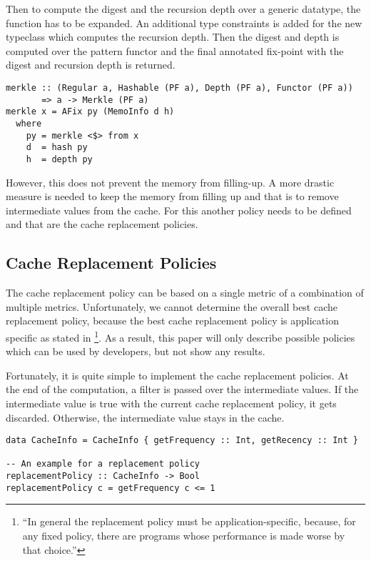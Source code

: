 Then to compute the digest and the recursion depth over a generic datatype, the  function has to be expanded. An additional type constraints  is added for the new typeclass which computes the recursion depth. Then the digest and depth is computed over the pattern functor and the final annotated fix-point with the digest and recursion depth is returned.

\begin{verbatim}
merkle :: (Regular a, Hashable (PF a), Depth (PF a), Functor (PF a)) 
       => a -> Merkle (PF a)
merkle x = AFix py (MemoInfo d h)
  where
    py = merkle <$> from x
    d  = hash py
    h  = depth py
\end{verbatim}

However, this does not prevent the memory from filling-up. A more drastic measure is needed to keep the memory from filling up and that is to remove intermediate values from the cache. For this another policy needs to be defined and that are the cache replacement policies.

\subsection{Cache Replacement Policies}

The cache replacement policy can be based on a single metric of a combination of multiple metrics. Unfortunately, we cannot determine the overall best cache replacement policy, because the best cache replacement policy is application specific as stated in \footnote{``In general the replacement policy must be application-specific, because, for any fixed policy, there are programs whose performance is made worse by that choice.''\cite{acar2003selective}}. As a result, this paper will only describe possible policies which can be used by developers, but not show any results.

Fortunately, it is quite simple to implement the cache replacement policies. At the end of the  computation, a filter is passed over the intermediate values. If the intermediate value is true with the current cache replacement policy, it gets discarded. Otherwise, the intermediate value stays in the cache. 

\begin{verbatim}
data CacheInfo = CacheInfo { getFrequency :: Int, getRecency :: Int }

-- An example for a replacement policy
replacementPolicy :: CacheInfo -> Bool
replacementPolicy c = getFrequency c <= 1
\end{verbatim}


